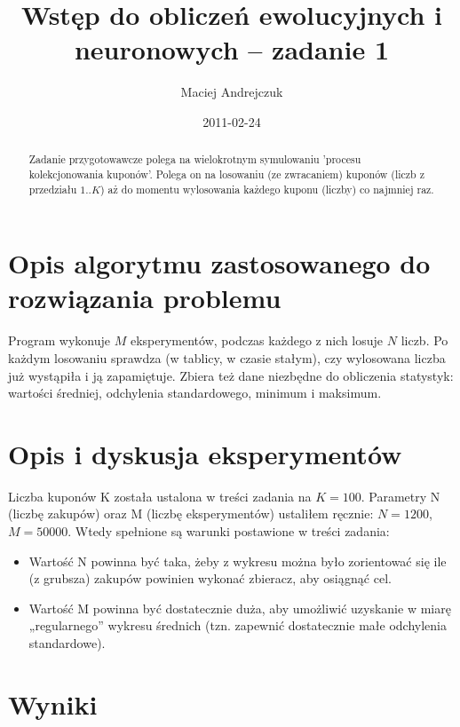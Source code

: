 \documentclass[11pt,a4paper]{article}
\title{Wstęp do obliczeń ewolucyjnych i neuronowych -- zadanie 1}
\author{Maciej Andrejczuk}
\date{2011-02-24}
\begin{document}
\maketitle

\begin{abstract}
Zadanie przygotowawcze polega na wielokrotnym symulowaniu 'procesu kolekcjonowania kuponów'.
Polega on na losowaniu (ze zwracaniem) kuponów (liczb z przedziału $1..K$) aż do momentu wylosowania każdego kuponu (liczby) co najmniej raz.

\end{abstract}

\newpage

\tableofcontents

\section{Opis algorytmu zastosowanego do rozwiązania problemu}

Program wykonuje $M$ eksperymentów, podczas każdego z nich losuje $N$ liczb.
Po każdym losowaniu sprawdza (w tablicy, w czasie stałym), czy wylosowana liczba już wystąpiła i ją zapamiętuje.
Zbiera też dane niezbędne do obliczenia statystyk: wartości średniej, odchylenia standardowego, minimum i maksimum.

\section{Opis i dyskusja eksperymentów}

Liczba kuponów K została ustalona w treści zadania na $K = 100$.
Parametry N (liczbę zakupów) oraz M (liczbę eksperymentów) ustaliłem ręcznie: $N = 1200$, $M = 50000$.
Wtedy spełnione są warunki postawione w treści zadania:
\begin{itemize}
\item Wartość N powinna być taka, żeby z wykresu można było zorientować się ile (z grubsza) zakupów powinien wykonać zbieracz,
aby osiągnąć cel.
\item Wartość M powinna być dostatecznie duża, aby umożliwić uzyskanie w miarę „regularnego” wykresu średnich (tzn. zapewnić dostatecznie małe odchylenia standardowe).
\end{itemize}

\section{Wyniki}
\end{document}
